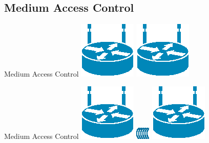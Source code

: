 \documentclass{beamer}
\begin{document}
\subsection{Medium Access Control}
\begin{frame}{Medium Access Control}
	\includegraphics[width=0.2\linewidth]{wireless.eps}
	\hfill
	\includegraphics[width=0.2\linewidth]{wireless.eps}
\end{frame}

\begin{frame}{Medium Access Control}
	\includegraphics[width=0.2\linewidth]{wireless.eps}
	\hfill
	\includegraphics[width=0.2\linewidth]{wave.eps}
	\includegraphics[width=0.2\linewidth]{wireless.eps}
\end{frame}
\end{document}
